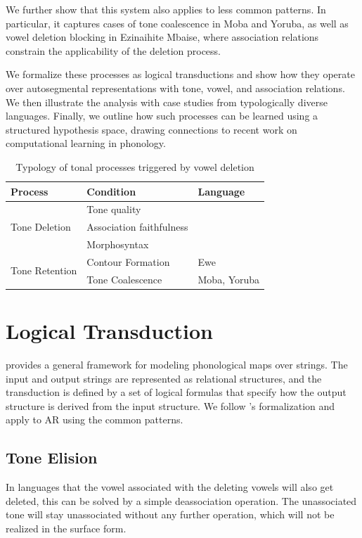 \documentclass{article}
\begin{document}
We further show that this system also applies to less common 
patterns. In particular, it captures cases of tone coalescence 
in Moba and Yoruba, as well as vowel deletion blocking 
in Ezinaihite Mbaise, where association relations constrain the 
applicability of the deletion process.

We formalize these processes as logical transductions and show how 
they operate over autosegmental representations with tone, vowel, 
and association relations. We then illustrate the analysis with 
case studies from typologically diverse languages. Finally, we 
outline how such processes can be learned using a structured 
hypothesis space, drawing connections to recent work on 
computational learning in phonology.


\begin{table}[ht]
\centering
\begin{tabular}{l|ll}
\toprule
Process & Condition & Language \\
\midrule
\multirow{3}{*}{Tone Deletion}
    & Tone quality 
    & \\
    & Association faithfulness 
    & \\
    & Morphosyntax 
    & \\
\midrule
\multirow{2}{*}{Tone Retention}
    & Contour Formation
    & Ewe \\
    & Tone Coalescence
    & Moba, Yoruba \\
\bottomrule
\end{tabular}
\caption{Typology of tonal processes triggered by vowel deletion}
\end{table}

\section{Logical Transduction}
\citet{yolyan2025logical} provides a general framework for modeling 
phonological maps over strings. The input and output strings are represented 
as relational structures, and the transduction is defined by a set of logical 
formulas that specify how the output structure is derived from the input 
structure. We follow \citeauthor{yolyan2025logical}'s formalization and apply
to AR using the common patterns.
\subsection{Tone Elision}
In languages that the vowel associated with the deleting vowels will also get 
deleted, this can be solved by a simple deassociation operation. The 
unassociated tone will stay unassociated without any further operation, which
will not be realized in the surface form. 
\end{document}
